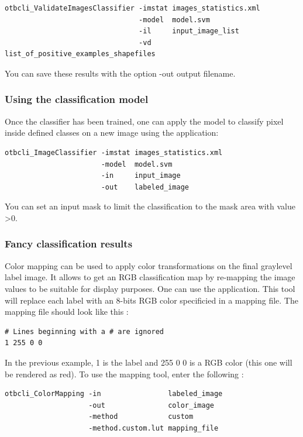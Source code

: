 \begin{verbatim}
otbcli_ValidateImagesClassifier -imstat images_statistics.xml
                                -model  model.svm
                                -il     input_image_list
                                -vd     list_of_positive_examples_shapefiles
\end{verbatim}

You can save these results with the option -out output filename.

\subsubsection{Using the classification model}
Once the classifier has been trained, one can apply the model to classify
pixel inside defined classes on a new image using the
 application:

\begin{verbatim}
otbcli_ImageClassifier -imstat images_statistics.xml
                       -model  model.svm
                       -in     input_image
                       -out    labeled_image
\end{verbatim}

You can set an input mask to limit the classification to the mask area with
value \textgreater 0.

\subsubsection{Fancy classification results}
\label{ssec:classificationcolormapping}
Color mapping can be used to apply color transformations on the final
graylevel label image. It allows to get an RGB classification map
by re-mapping the image values to be suitable for display purposes.
One can use the  application. This tool will
replace each label with an 8-bits RGB color specificied in a mapping
file. The mapping file should look like this :

\begin{verbatim}
# Lines beginning with a # are ignored
1 255 0 0
\end{verbatim}

In the previous example, 1 is the label and 255 0 0 is a RGB color
(this one will be rendered as red). To use the mapping tool, enter
the following :

\begin{verbatim}
otbcli_ColorMapping -in                labeled_image
                    -out               color_image
                    -method            custom
                    -method.custom.lut mapping_file
\end{verbatim}

